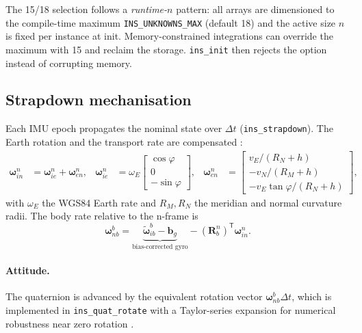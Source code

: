 \documentclass[11pt,a4paper]{article}
\newcommand{\vect}[1]{\bm{#1}}
\newcommand{\mat}[1]{\bm{#1}}
\newcommand{\T}{^{\mathsf{T}}}
\newcommand{\nframe}{n}
\newcommand{\bframe}{b}
\newcommand{\eframe}{e}
\newcommand{\Rbn}{\mat{R}_{\bframe}^{\nframe}}
\newcommand{\dt}{\Delta t}
\newcommand{\code}[1]{\texttt{#1}}
\begin{document}
The 15/18 selection follows a \emph{runtime-$n$} pattern: all arrays are
dimensioned to the compile-time maximum \code{INS\_\allowbreak{}UNKNOWNS\_\allowbreak{}MAX}
(default 18) and the active size $n$ is fixed per instance at init.
Memory-constrained integrations can override the maximum with 15 and
reclaim the storage. \code{ins\_\allowbreak{}init} then rejects the option instead
of corrupting memory.

\subsection{Strapdown mechanisation}
\label{sec:strapdown}

Each IMU epoch propagates the nominal state over $\dt$
(\code{ins\_\allowbreak{}strapdown}). The Earth rotation and the transport rate are
compensated \cite[Sec.~3.3]{wendel2011}:
\begin{align}
  \vect{\omega}^\nframe_{i\nframe}
    &= \vect{\omega}^\nframe_{i\eframe}
     + \vect{\omega}^\nframe_{\eframe\nframe}, &
  \vect{\omega}^\nframe_{i\eframe}
    &= \omega_E \begin{bmatrix} \cos\varphi \\ 0 \\ -\sin\varphi
       \end{bmatrix}, &
  \vect{\omega}^\nframe_{\eframe\nframe}
    &= \begin{bmatrix}
         v_E / (R_N + h) \\
         -v_N / (R_M + h) \\
         -v_E \tan\varphi / (R_N + h)
       \end{bmatrix},
\end{align}
with $\omega_E$ the WGS84 Earth rate and $R_M, R_N$ the meridian and
normal curvature radii. The body rate relative to the n-frame is
\begin{equation}
  \vect{\omega}^\bframe_{\nframe\bframe}
  = \underbrace{\tilde{\vect{\omega}}^\bframe_{i\bframe}
    - \vect{b}_g}_{\text{bias-corrected gyro}}
  - \left(\Rbn\right)\T \vect{\omega}^\nframe_{i\nframe} .
\end{equation}

\paragraph{Attitude.} The quaternion is advanced by the equivalent
rotation vector $\vect{\omega}^\bframe_{\nframe\bframe}\dt$, which is
implemented in \code{ins\_\allowbreak{}quat\_\allowbreak{}rotate} with a Taylor-series
expansion for numerical robustness near zero rotation
\cite{wendel2011}.
\end{document}
